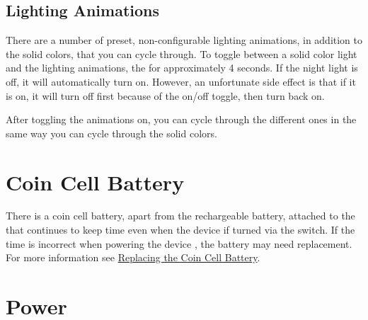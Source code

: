 
\subsection{Lighting Animations}

There are a number of preset, non-configurable lighting animations, in addition
to the solid colors, that you can cycle through.  To toggle between a solid
color light and the lighting animations,  the  for approximately
\num{4} seconds. If the night light is off, it will automatically turn on.
However, an unfortunate side effect is that if it is on, it will turn off first
because of the on/off toggle, then turn back on.


After toggling the animations on, you can cycle through the different ones in
the same way you can cycle through the solid colors.

\section{Coin Cell Battery}

There is a  coin cell battery, apart from the rechargeable
battery, attached to the  that continues to keep time even when the
device if turned  via the  switch.  If the time is incorrect
when powering the device , the battery may need replacement.  For more
information see \hyperref[Replacing Battery]{Replacing the Coin Cell Battery}.

\section{Power}

